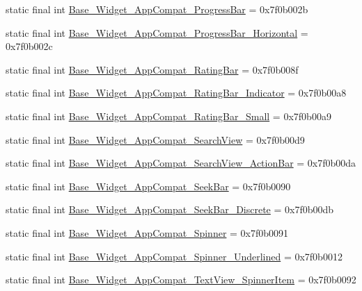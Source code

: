 \begin{CompactItemize}
static final int \hyperlink{classandroid_1_1support_1_1v7_1_1recyclerview_1_1_r_1_1style_f70233a95ce9b50fcd9e0b7f0b9ae822}{Base\_\-Widget\_\-AppCompat\_\-ProgressBar} = 0x7f0b002b
\item 
static final int \hyperlink{classandroid_1_1support_1_1v7_1_1recyclerview_1_1_r_1_1style_808d730cfbf6b1436862ceefa2aac437}{Base\_\-Widget\_\-AppCompat\_\-ProgressBar\_\-Horizontal} = 0x7f0b002c
\item 
static final int \hyperlink{classandroid_1_1support_1_1v7_1_1recyclerview_1_1_r_1_1style_003ba5d4f0b470647a2fcf08dce23f65}{Base\_\-Widget\_\-AppCompat\_\-RatingBar} = 0x7f0b008f
\item 
static final int \hyperlink{classandroid_1_1support_1_1v7_1_1recyclerview_1_1_r_1_1style_47862dfeee2dd3dce646626b273b871f}{Base\_\-Widget\_\-AppCompat\_\-RatingBar\_\-Indicator} = 0x7f0b00a8
\item 
static final int \hyperlink{classandroid_1_1support_1_1v7_1_1recyclerview_1_1_r_1_1style_8b4f71614aa93dd3bc348d85c2504588}{Base\_\-Widget\_\-AppCompat\_\-RatingBar\_\-Small} = 0x7f0b00a9
\item 
static final int \hyperlink{classandroid_1_1support_1_1v7_1_1recyclerview_1_1_r_1_1style_b96284e4193cfac4f7b94e43a4373add}{Base\_\-Widget\_\-AppCompat\_\-SearchView} = 0x7f0b00d9
\item 
static final int \hyperlink{classandroid_1_1support_1_1v7_1_1recyclerview_1_1_r_1_1style_5b312f34f85bf6e046bd9203c2c9b970}{Base\_\-Widget\_\-AppCompat\_\-SearchView\_\-ActionBar} = 0x7f0b00da
\item 
static final int \hyperlink{classandroid_1_1support_1_1v7_1_1recyclerview_1_1_r_1_1style_2fc190d8d7fa116d957543625f417e2f}{Base\_\-Widget\_\-AppCompat\_\-SeekBar} = 0x7f0b0090
\item 
static final int \hyperlink{classandroid_1_1support_1_1v7_1_1recyclerview_1_1_r_1_1style_2b1aa45d2e7c7465393db45a93bca417}{Base\_\-Widget\_\-AppCompat\_\-SeekBar\_\-Discrete} = 0x7f0b00db
\item 
static final int \hyperlink{classandroid_1_1support_1_1v7_1_1recyclerview_1_1_r_1_1style_1f6d28a2e6c210414c5b7eaf29e0ed4c}{Base\_\-Widget\_\-AppCompat\_\-Spinner} = 0x7f0b0091
\item 
static final int \hyperlink{classandroid_1_1support_1_1v7_1_1recyclerview_1_1_r_1_1style_987d770b60ba749dd2a5626815b9a43c}{Base\_\-Widget\_\-AppCompat\_\-Spinner\_\-Underlined} = 0x7f0b0012
\item 
static final int \hyperlink{classandroid_1_1support_1_1v7_1_1recyclerview_1_1_r_1_1style_07288409f495c31cafd203d1592d7711}{Base\_\-Widget\_\-AppCompat\_\-TextView\_\-SpinnerItem} = 0x7f0b0092

\end{CompactItemize}
